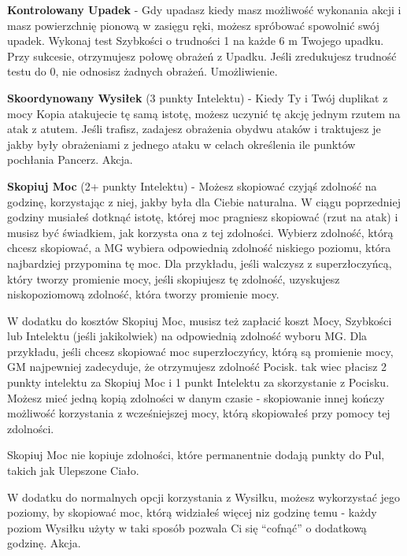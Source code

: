 {\textbf{Kontrolowany Upadek}\label{sec:Kontrolowany Upadek} - Gdy upadasz kiedy masz możliwość wykonania akcji i masz powierzchnię pionową w zasięgu ręki, możesz spróbować spowolnić swój upadek. Wykonaj test Szybkości o trudności 1 na każde 6 m Twojego upadku. Przy sukcesie, otrzymujesz połowę obrażeń z Upadku. Jeśli zredukujesz trudność testu do 0, nie odnosisz żadnych obrażeń. Umożliwienie. 

\textbf{Skoordynowany Wysiłek}\label{sec:Skoordynowany Wysiłek} (3 punkty Intelektu) - Kiedy Ty i Twój duplikat z mocy Kopia atakujecie tę samą istotę, możesz uczynić tę akcję jednym rzutem na atak z atutem. Jeśli trafisz, zadajesz obrażenia obydwu ataków i traktujesz je jakby były obrażeniami z jednego ataku w celach określenia ile punktów pochłania Pancerz. Akcja.

\textbf{Skopiuj Moc}\label{sec:Skopiuj Moc} (2+ punkty Intelektu) - Możesz skopiować czyjąś zdolność na godzinę, korzystając z niej, jakby była dla Ciebie naturalna. W ciągu poprzedniej godziny musiałeś dotknąć istotę, której moc pragniesz skopiować (rzut na atak) i musisz być świadkiem, jak korzysta ona z tej zdolności. Wybierz zdolność, którą chcesz skopiować, a MG wybiera odpowiednią zdolność niskiego poziomu, która najbardziej przypomina tę moc. Dla przykładu, jeśli walczysz z superzłoczyńcą, który tworzy promienie mocy, jeśli skopiujesz tę zdolność, uzyskujesz niskopoziomową zdolność, która tworzy promienie mocy. 

W dodatku do kosztów Skopiuj Moc, musisz też zapłacić koszt Mocy, Szybkości lub Intelektu (jeśli jakikolwiek) na odpowiednią zdolność wyboru MG. Dla przykładu, jeśli chcesz skopiować moc superzłoczyńcy, którą są promienie mocy, GM najpewniej zadecyduje, że otrzymujesz zdolność Pocisk. tak wiec płacisz 2 punkty intelektu za Skopiuj Moc i 1 punkt Intelektu za skorzystanie z Pocisku. Możesz mieć jedną kopią zdolności w danym czasie - skopiowanie innej kończy możliwość korzystania z wcześniejszej mocy, którą skopiowałeś przy pomocy tej zdolności.

Skopiuj Moc nie kopiuje zdolności, które permanentnie dodają punkty do Pul, takich jak Ulepszone Ciało. 

W dodatku do normalnych opcji korzystania z Wysiłku, możesz wykorzystać jego poziomy, by skopiować moc, którą widziałeś więcej niz godzinę temu - każdy poziom Wysiłku użyty w taki sposób pozwala Ci się ``cofnąć'' o dodatkową godzinę. Akcja.

}
